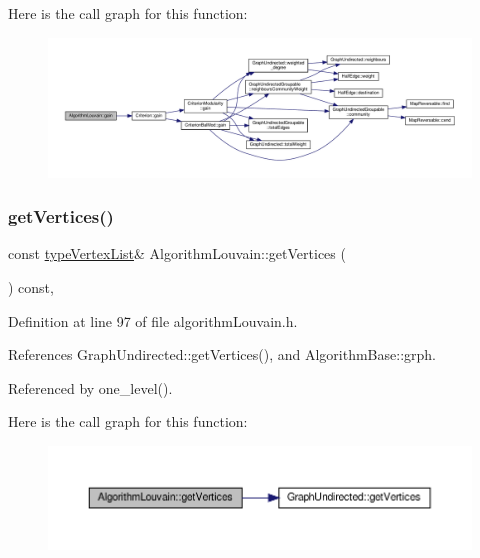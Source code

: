 Here is the call graph for this function\+:
\nopagebreak
\begin{figure}[H]
\begin{center}
\leavevmode
\includegraphics[width=350pt]{classAlgorithmLouvain_adcd4a8dc566881f9c1b1d9e78730a503_cgraph}
\end{center}
\end{figure}
\mbox{\label{classAlgorithmLouvain_a627618ba516be4f4906143b6b0ff1c77}} 
\subsubsection{\texorpdfstring{get\+Vertices()}{getVertices()}}
{\footnotesize\ttfamily const \hyperlink{graphInterface_8h_a21d54d8a139def524d3b0d6f71ec4974}{type\+Vertex\+List}\& Algorithm\+Louvain\+::get\+Vertices (\begin{DoxyParamCaption}{ }\end{DoxyParamCaption}) const\hspace{0.3cm}{\ttfamily [inline]}, {\ttfamily [private]}}



Definition at line 97 of file algorithm\+Louvain.\+h.



References Graph\+Undirected\+::get\+Vertices(), and Algorithm\+Base\+::grph.



Referenced by one\+\_\+level().

Here is the call graph for this function\+:
\nopagebreak
\begin{figure}[H]
\begin{center}
\leavevmode
\includegraphics[width=350pt]{classAlgorithmLouvain_a627618ba516be4f4906143b6b0ff1c77_cgraph}
\end{center}
\end{figure}
\mbox{\label{classAlgorithmLouvain_a066612d0b1d64d8f5c7d84f20bbf70c4}} 
